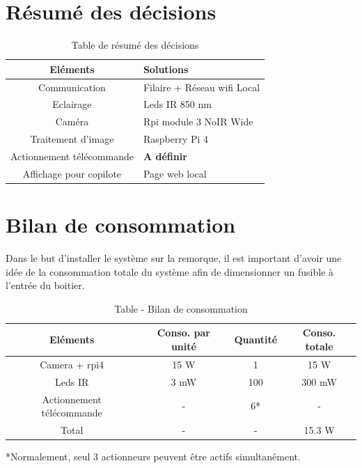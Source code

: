 \section{Résumé des décisions}
\begin{table}[H]
    \begin{center}
        \caption{Table de résumé des décisions}
        \begin{tabular}{|c|l|}
            Eléments                  & Solutions                         \\ \hline
            Communication             & Filaire + Réseau \Gls{wifi} Local \\
            Eclairage                 & Leds IR 850 \si{\nano\metre}      \\
            Caméra                    & Rpi module 3 NoIR Wide            \\
            Traitement d'image        & Raspberry Pi 4                    \\
            Actionnement télécommande & \textbf{A définir}                \\
            Affichage pour copilote   & Page web local                    \\
        \end{tabular}
    \end{center}
\end{table}
\newpage
\section{Bilan de consommation}
Dans le but d'installer le système sur la remorque, il est important d'avoir une idée de la consommation totale du système afin de dimensionner
un fusible à l'entrée du boitier.

\begin{table}[H]
    \begin{center}
        \caption{Table - Bilan de consommation}
        \begin{tabular}{|c|c|c|c|}
            Eléments                  & Conso. par unité   & Quantité & Conso. totale        \\ \hline
            Camera + \Gls{rpi4}       & 15 \si{\watt}      & 1        & 15    \si{\watt}     \\
            Leds IR                   & 3 \si{\milli\watt} & 100      & 300 \si{\milli\watt} \\
            Actionnement télécommande & -                  & 6*       & -                    \\
            Total                     & -                  & -        & 15.3 \si{\watt}      \\
        \end{tabular}
    \end{center}

    *Normalement, seul 3 actionneurs peuvent être actifs simultanément.
\end{table}


